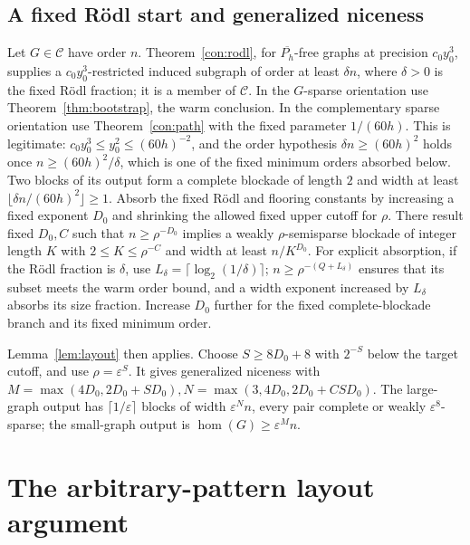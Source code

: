 \documentclass[11pt,a4paper]{article}
\theoremstyle{definition}
\theoremstyle{remark}
\numberwithin{equation}{section}
\begin{document}
\subsection{A fixed R\"odl start and generalized niceness}\label{subsec:rodl-start}
Let \(G\in\mathcal C\) have order \(n\). Theorem~\ref{con:rodl}, for \(\overline{P_{h}}\)-free graphs at precision \(c_{0} y_{0}^{3}\), supplies a \(c_{0} y_{0}^{3}\)-restricted induced subgraph of order at least \(\delta n\), where \(\delta>0\) is the fixed R\"odl fraction; it is a member of \(\mathcal C\). In the \(G\)-sparse orientation use Theorem~\ref{thm:bootstrap}, the warm conclusion. In the complementary sparse orientation use Theorem~\ref{con:path} with the fixed parameter \(1/(60h)\). This is legitimate: \(c_{0}y_{0}^{3}\le y_{0}^{2}\le (60h)^{-2}\), and the order hypothesis \(\delta n\ge (60h)^{2}\) holds once \(n\ge (60h)^{2}/\delta\), which is one of the fixed minimum orders absorbed below. Two blocks of its output form a complete blockade of length \(2\) and width at least \(\lfloor \delta n/(60h)^{2}\rfloor\ge1\). Absorb the fixed R\"odl and flooring constants by increasing a fixed exponent \(D_{0}\) and shrinking the allowed fixed upper cutoff for \(\rho\). There result fixed \(D_{0},\allowbreak C\) such that \(n\ge\allowbreak \rho^{-D_{0}}\) implies a weakly \(\rho\)-semisparse blockade of integer length \(K\) with \(2\le\allowbreak K\le\allowbreak \rho^{-C}\) and width at least \(n/K^{D_{0}}\). For explicit absorption, if the R\"odl fraction is \(\delta\), use \(L_{\delta}=\lceil \log _{2}(1/\delta)\rceil\); \(n\ge\allowbreak \rho^{-(Q+L_{\delta})}\) ensures that its subset meets the warm order bound, and a width exponent increased by \(L_{\delta}\) absorbs its size fraction. Increase \(D_{0}\) further for the fixed complete-blockade branch and its fixed minimum order.

Lemma~\ref{lem:layout} then applies. Choose \(S\ge\allowbreak 8D_{0}+8\) with \(2^{-S}\) below the target cutoff, and use \(\rho=\varepsilon^{S}\). It gives generalized niceness with \(M=\max (4D_{0},\allowbreak 2D_{0}+S D_{0}),\allowbreak  N=\max (3,\allowbreak 4D_{0},\allowbreak 2D_{0}+C S D_{0})\). The large-graph output has \(\lceil 1/\varepsilon\rceil\) blocks of width \(\varepsilon^{N} n\), every pair complete or weakly \(\varepsilon^{8}\)-sparse; the small-graph output is \(\hom (G)\ge\allowbreak \varepsilon^{M} n\).




\section{The arbitrary-pattern layout argument}\label{app:layout}
\end{document}

